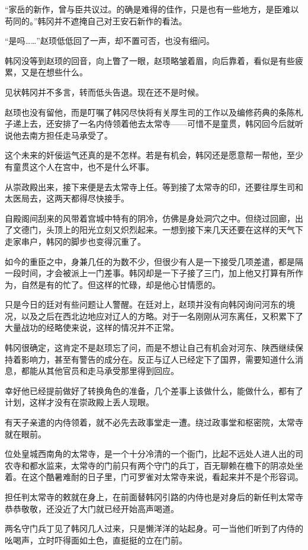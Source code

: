 “家岳的新作，曾与臣共议过。的确是难得的佳作，只是也有一些地方，是臣难以苟同的。”韩冈并不遮掩自己对王安石新作的看法。

“是吗……”赵顼低低回了一声，却不置可否，也没有细问。

韩冈没等到赵顼的回音，向上瞥了一眼，赵顼略皱着眉，向后靠着，看似是有些疲累，又是在想些什么。

见状韩冈并不多言，转而低头告退。现在还不是时候。

赵顼也没有留他，而是叮嘱了韩冈尽快将有关厚生司的工作以及编修药典的条陈札子递上去，还安排了一名内侍领着他去太常寺——可惜不是童贯，韩冈回今后就听说他去南方担任走马承受了。

这个未来的奸佞运气还真的是不怎样。若是有机会，韩冈还是愿意帮一帮他，至少有童贯这个人在宫中，也不是什么坏事。

从崇政殿出来，接下来便是去太常寺上任。等到接了太常寺的印，还要往厚生司和太医局去，这两天都得尽快接手。

自殿阁间刮来的风带着宫城中特有的阴冷，仿佛是身处洞穴之中。但绕过回廊，出了文德门，头顶上的阳光立刻又炽烈起来。一想到接下来几天还要在这样的天气下走家串户，韩冈的脚步也变得沉重了。

如今的重臣之中，身兼几任的为数不少，但很少有人是一下接受几项差遣，都是隔一段时间，才会被派上一门差事。韩冈却是一下子接了三门，加上他又打算有所作为，自然是有的忙了。但这样的忙碌，却是他心甘情愿的。

只是今日的廷对有些问题让人警醒。在廷对上，赵顼并没有向韩冈询问河东的境况，以及之后在西北边地应对辽人的方略。对于一名刚刚从河东离任，又积累下了大量战功的经略使来说，这样的情况并不正常。

韩冈很确定，这肯定不是赵顼忘了问，而是不想让自己有机会对河东、陕西继续保持着影响力，甚至有警告的成分在。反正与辽人已经定下了国界，需要知道什么消息，都能从其他官员和走马承受那里得到回应。

幸好他已经提前做好了转换角色的准备，几个差事上该做什么，能做什么，都有了计划，这样才没有在崇政殿上丢人现眼。

有天子亲遣的内侍领着，就不必先去政事堂走一遭。绕过政事堂和枢密院，太常寺就在眼前。

位处皇城西南角的太常寺，是一个十分冷清的一个衙门，比起不远处人进人出的司农寺和都水监来，太常寺的门前只有两个守门的兵丁，百无聊赖在檐下的阴凉处坐着。在这个酷暑难耐的日子里，门可罗雀对太常寺来说，看起来并不是个形容词。

担任判太常寺的敕就在身上，在前面替韩冈引路的内侍也是对身后的新任判太常寺恭恭敬敬，还没近了大门就已经开始高声喝道。

两名守门兵丁见了韩冈几人过来，只是懒洋洋的站起身。可一当他们听到了内侍的吆喝声，立时吓得面如土色，直挺挺的立在门前。

